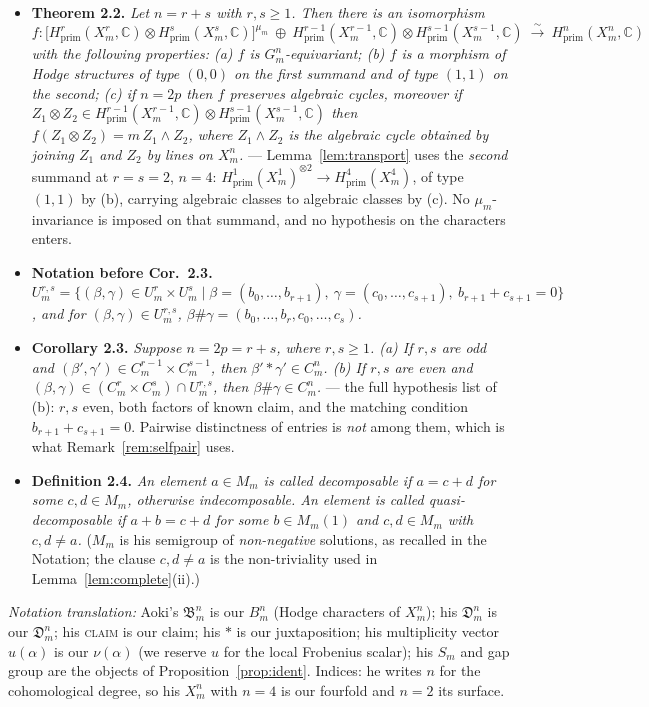 \documentclass[11pt]{amsart}
\theoremstyle{remark}
\newcommand{\Ds}{\mathfrak{D}}
\newcommand{\C}{\mathbb{C}}
\begin{document}
\begin{itemize}
\item[--] \textbf{Theorem 2.2.} \emph{Let $n=r+s$ with $r,s\ge1$. Then there is an
isomorphism}
\[
f\colon\bigl[H^{r}_{\mathrm{prim}}(X^r_m,\C)\otimes H^{s}_{\mathrm{prim}}(X^s_m,\C)
\bigr]^{\mu_m}\ \oplus\ H^{r-1}_{\mathrm{prim}}(X^{r-1}_m,\C)\otimes
H^{s-1}_{\mathrm{prim}}(X^{s-1}_m,\C)\ \xrightarrow{\ \sim\ }\ H^n_{\mathrm{prim}}(X^n_m,\C)
\]
\emph{with the following properties: {\rm(a)} $f$ is $G^n_m$-equivariant; {\rm(b)} $f$ is a
morphism of Hodge structures of type $(0,0)$ on the first summand and of type $(1,1)$ on the
second; {\rm(c)} if $n=2p$ then $f$ preserves algebraic cycles, moreover if
$Z_1\otimes Z_2\in H^{r-1}_{\mathrm{prim}}(X^{r-1}_m,\C)\otimes
H^{s-1}_{\mathrm{prim}}(X^{s-1}_m,\C)$ then $f(Z_1\otimes Z_2)=m\,Z_1\wedge Z_2$, where
$Z_1\wedge Z_2$ is the algebraic cycle obtained by joining $Z_1$ and $Z_2$ by lines on
$X^n_m$.} --- Lemma~\ref{lem:transport} uses the \emph{second} summand at $r=s=2$, $n=4$:
$H^1_{\mathrm{prim}}(X^1_m)^{\otimes2}\to H^4_{\mathrm{prim}}(X^4_m)$, of type $(1,1)$ by (b),
carrying algebraic classes to algebraic classes by (c). No $\mu_m$-invariance is imposed on that
summand, and no hypothesis on the characters enters.
\item[--] \textbf{Notation before Cor.~2.3.} \emph{$U^{r,s}_m=\{(\beta,\gamma)\in
U^r_m\times U^s_m\mid\beta=(b_0,\dots,b_{r+1}),\ \gamma=(c_0,\dots,c_{s+1}),\
b_{r+1}+c_{s+1}=0\}$, and for $(\beta,\gamma)\in U^{r,s}_m$,
$\beta\#\gamma=(b_0,\dots,b_r,c_0,\dots,c_s)$.}
\item[--] \textbf{Corollary 2.3.} \emph{Suppose $n=2p=r+s$, where $r,s\ge1$.
{\rm(a)} If $r,s$ are odd and $(\beta',\gamma')\in C^{r-1}_m\times C^{s-1}_m$, then
$\beta'*\gamma'\in C^n_m$. {\rm(b)} If $r,s$ are even and
$(\beta,\gamma)\in(C^r_m\times C^s_m)\cap U^{r,s}_m$, then $\beta\#\gamma\in C^n_m$.}
--- the full hypothesis list of (b): $r,s$ even, both factors of known claim, and the matching
condition $b_{r+1}+c_{s+1}=0$. Pairwise distinctness of entries is \emph{not} among them,
which is what Remark~\ref{rem:selfpair} uses.
\item[--] \textbf{Definition 2.4.} \emph{An element $a\in M_m$ is called decomposable if
$a=c+d$ for some $c,d\in M_m$, otherwise indecomposable. An element is called
quasi-decomposable if $a+b=c+d$ for some $b\in M_m(1)$ and $c,d\in M_m$ with $c,d\neq a$.}
($M_m$ is his semigroup of \emph{non-negative} solutions, as recalled in the Notation; the
clause $c,d\neq a$ is the non-triviality used in Lemma~\ref{lem:complete}(ii).)
\end{itemize} \emph{Notation translation:} Aoki's $\mathfrak B^n_m$ is our $B^n_m$ (Hodge characters
of $X^n_m$); his $\mathfrak D^n_m$ is our $\Ds^n_m$; his \textsc{claim} is our
$\mathrm{claim}$; his $*$ is our juxtaposition; his multiplicity vector $u(\alpha)$ is our
$\nu(\alpha)$ (we reserve $u$ for the local Frobenius scalar); his $S_m$ and gap group are the
objects of Proposition~\ref{prop:ident}. Indices: he writes $n$ for the cohomological degree,
so his $X^n_m$ with $n=4$ is our fourfold and $n=2$ its surface.
\end{document}
